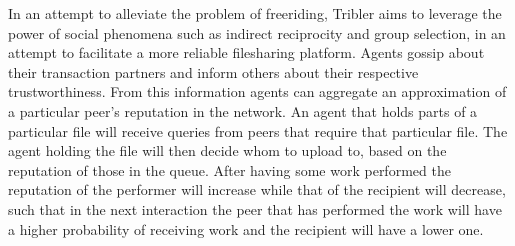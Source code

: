 \documentclass[11pt,a4paper]{article}
\theoremstyle{definition}
\theoremstyle{theorem}
\theoremstyle{proposition}
\theoremstyle{corollary}
\theoremstyle{lemma}
\theoremstyle{example}
\theoremstyle{remark}
\begin{document}
\noindent{}In an attempt to alleviate the problem of freeriding, Tribler aims to leverage the power of social phenomena such as indirect reciprocity and group selection, in an attempt to facilitate a more reliable filesharing platform. Agents gossip about their transaction partners and inform others about their respective trustworthiness. From this information agents can aggregate an approximation of a particular peer's reputation in the network. An agent that holds parts of a particular file will receive queries from peers that require that particular file. The agent holding the file will then decide whom to upload to, based on the reputation of those in the queue. After having some work performed the reputation of the performer will increase while that of the recipient will decrease, such that in the next interaction the peer that has performed the work will have a higher probability of receiving work and the recipient will have a lower one. \vspace{1em}\\

\end{document}
